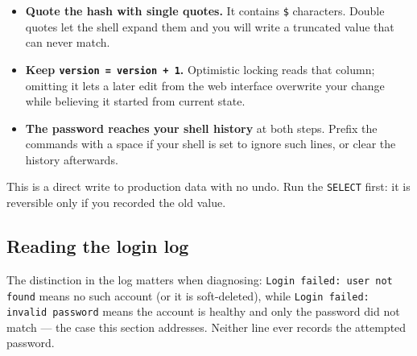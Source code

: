 \begin{itemize}
  \item \textbf{Quote the hash with single quotes.} It contains
        \texttt{\$} characters. Double quotes let the shell expand them
        and you will write a truncated value that can never match.
  \item \textbf{Keep \texttt{version = version + 1}.} Optimistic
        locking reads that column; omitting it lets a later edit from
        the web interface overwrite your change while believing it
        started from current state.
  \item \textbf{The password reaches your shell history} at both steps.
        Prefix the commands with a space if your shell is set to ignore
        such lines, or clear the history afterwards.
\end{itemize}

This is a direct write to production data with no undo. Run the
\texttt{SELECT} first: it is reversible only if you recorded the old
value.

\subsection*{Reading the login log}

The distinction in the log matters when diagnosing:
\texttt{Login failed: user not found} means no such account (or it is
soft-deleted), while \texttt{Login failed: invalid password} means the
account is healthy and only the password did not match — the case this
section addresses. Neither line ever records the attempted password.
